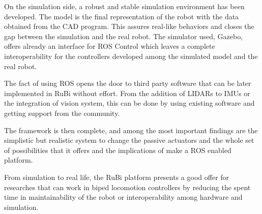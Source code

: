 On the simulation side, a robust and stable simulation environment has been developed.
The model is the final representation of the robot with the data obtained from the CAD program.
This assures real-like behaviors and closes the gap between the simulation and the real robot.
The simulator used, Gazebo, offers already an interface for ROS Control which leaves a complete interoperability for the controllers developed among the simulated model and the real robot.

The fact of using ROS opens the door to third party software that can be later implemented in RuBi without effort.
From the addition of LIDARs to IMUs or the integration of vision system, this can be done by using existing software and getting support from the community.


The framework is then complete, and among the most important findings are the simplistic but realistic system to change the passive actuators and the whole set of possibilities that it offers and the implications of make a ROS enabled platform.

From simulation to real life, the RuBi platform presents a good offer for researches that can work in biped locomotion controllers by reducing the spent time in maintainability of the robot or interoperability among hardware and simulation.


